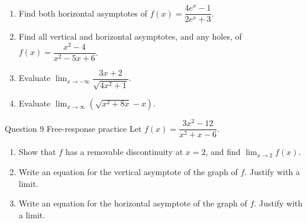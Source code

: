 \documentclass[11pt]{article}
\begin{document}
\begin{enumerate}[leftmargin=*,itemsep=2pt,start=5]
  \item Find both horizontal asymptotes of $f(x)=\dfrac{4e^x-1}{2e^x+3}$.\work{2.8cm}
  \item Find all vertical and horizontal asymptotes, and any holes, of $f(x)=\dfrac{x^2-4}{x^2-5x+6}$.\work{2.8cm}
  \item Evaluate $\displaystyle\lim_{x\to -\infty}\dfrac{3x+2}{\sqrt{4x^2+1}}$.\work{2.8cm}
  \item Evaluate $\displaystyle\lim_{x\to \infty}\left(\sqrt{x^2+8x}-x\right)$.\work{2.8cm}
\end{enumerate}

\begin{frbox}{Question 9 \textperiodcentered{} Free-response practice}
Let $f(x)=\dfrac{3x^2-12}{x^2+x-6}$.
\begin{enumerate}[label=(\alph*),leftmargin=*,itemsep=2pt]
  \item Show that $f$ has a removable discontinuity at $x=2$, and find $\displaystyle\lim_{x\to 2}f(x)$.\work{2.6cm}
  \item Write an equation for the vertical asymptote of the graph of $f$. Justify with a limit.\work{2.6cm}
  \item Write an equation for the horizontal asymptote of the graph of $f$. Justify with a limit.\work{2.6cm}
\end{enumerate}
\end{frbox}
\end{document}
